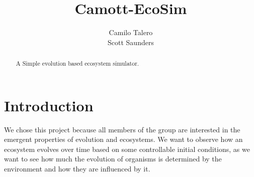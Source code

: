 \documentclass[runningheads]{llncs}
\begin{document}
\title{Camott-EcoSim}

\author{Camilo Talero \\  Scott Saunders  }


\maketitle


\begin{abstract} 
A Simple evolution based ecosystem simulator.
\end{abstract}


\section{Introduction}
\label{sec:Introduction}
%
We chose this project because all members of the group are interested in the emergent properties of evolution and ecosystems. We want to observe how an ecosystem evolves over time based on some controllable initial conditions, as we want to see how much the evolution of organisms is determined by the environment and how they are influenced by it.
\end{document}

